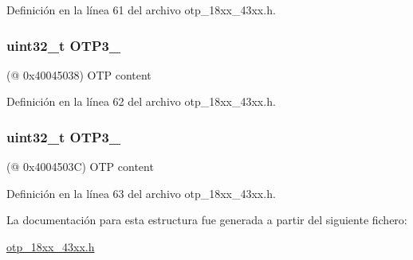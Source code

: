 Definición en la línea 61 del archivo otp\+\_\+18xx\+\_\+43xx.\+h.

\subsubsection[{\texorpdfstring{O\+T\+P3\+\_\+2}{OTP3_2}}]{ uint32\+\_\+t O\+T\+P3\+\_}\hypertarget{struct_l_p_c___o_t_p___t_a796f6f9df01508aa48307936ed3b5b81}{}\label{struct_l_p_c___o_t_p___t_a796f6f9df01508aa48307936ed3b5b81}
(@ 0x40045038) O\+TP content 

Definición en la línea 62 del archivo otp\+\_\+18xx\+\_\+43xx.\+h.

\subsubsection[{\texorpdfstring{O\+T\+P3\+\_\+3}{OTP3_3}}]{ uint32\+\_\+t O\+T\+P3\+\_}\hypertarget{struct_l_p_c___o_t_p___t_a3b6537dec86bbda90d637344cc470f2d}{}\label{struct_l_p_c___o_t_p___t_a3b6537dec86bbda90d637344cc470f2d}
(@ 0x4004503C) O\+TP content 

Definición en la línea 63 del archivo otp\+\_\+18xx\+\_\+43xx.\+h.



La documentación para esta estructura fue generada a partir del siguiente fichero\+:\begin{DoxyCompactItemize}
\item 
\hyperlink{otp__18xx__43xx_8h}{otp\+\_\+18xx\+\_\+43xx.\+h}\end{DoxyCompactItemize}
